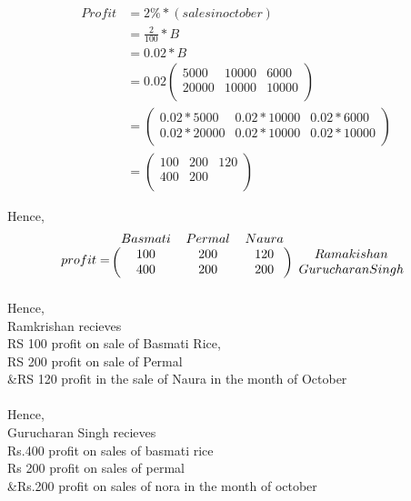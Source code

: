 \documentclass{article}
\begin{document}
\begin{equation*}
    \begin{split}
         Profit &= 2 \% *(sales in october)\\
              &=\frac{2}{100} * B\\
              &=0.02 * B\\
              & =0.02 \begin{pmatrix} 
                        5000 & 10000 & 6000\\20000 & 10000 & 10000 \\ 
                    \end{pmatrix}\\
             &=\begin{pmatrix} 
                    0.02*5000 & 0.02*10000 & 0.02*6000\\0.02*20000 & 0.02*10000 & 0.02*10000 \\ 
                \end{pmatrix}\\
           & =\begin{pmatrix} 
                    100 & 200 & 120\\400 & 200 &\\
                \end{pmatrix}
    \end{split}
\end{equation*}
       
            
    

Hence,
\[ profit = 
\begin{blockarray}{cccc}
Basmati & Permal & Naura \\
\begin{block}{(ccc)c}
  100 & 200 & 120 & Ramakishan\\
400 & 200 & 200 & Gurucharan Singh\\
\end{block}
\end{blockarray}
 \]
Hence,\\
Ramkrishan recieves\\

RS 100 profit on sale of Basmati Rice,\\

RS 200 profit on sale of Permal\\

&RS 120 profit in the sale of Naura in the month of October\\ \\
Hence,\\
Gurucharan Singh recieves \\

Rs.400 profit on sales of basmati rice\\

Rs 200 profit on sales of permal\\

&Rs.200 profit on sales of nora in the month of october\\
\end{document}
